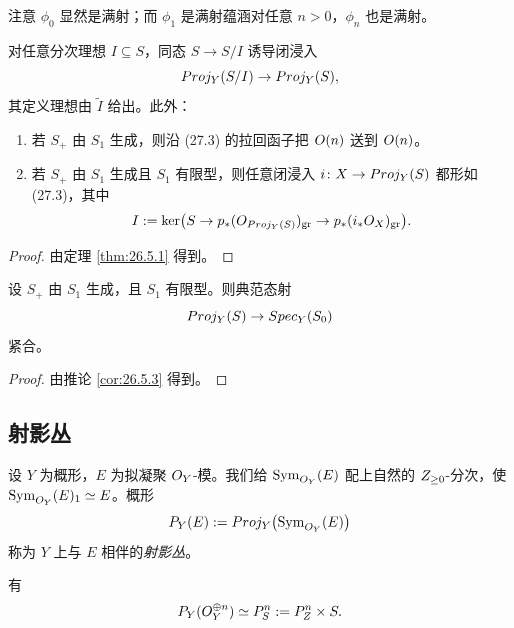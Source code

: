 \begin{remark}\label{rem:27.3.8}
注意 $\phi_0$ 显然是满射；而 $\phi_1$ 是满射蕴涵对任意 $n > 0$，$\phi_n$ 也是满射。
\end{remark}

\begin{corollary}\label{cor:27.3.9}
对任意分次理想 $I \subseteq S$，同态 $S \to S/I$ 诱导闭浸入
\begin{equation}\label{eq:27.3}
Proj_Y(S/I) \to Proj_Y(S),
\end{equation}
其定义理想由 $\widetilde{I}$ 给出。此外：
\begin{enumerate}[label=(\arabic*),leftmargin=2.4em,itemsep=0.25ex]
  \item 若 $S_+$ 由 $S_1$ 生成，则沿 (27.3) 的拉回函子把 $O(n)$ 送到 $O(n)$。
  \item 若 $S_+$ 由 $S_1$ 生成且 $S_1$ 有限型，则任意闭浸入 $i \colon X \to Proj_Y(S)$ 都形如 (27.3)，其中
  \[
  I := \ker\bigl(S \to p_*(O_{Proj_Y(S)})_{\mathrm{gr}} \to p_*(i_*O_X)_{\mathrm{gr}}\bigr).
  \]
\end{enumerate}
\end{corollary}

\begin{proof}
由定理 \ref{thm:26.5.1} 得到。
\end{proof}

\begin{corollary}\label{cor:27.3.10}
设 $S_+$ 由 $S_1$ 生成，且 $S_1$ 有限型。则典范态射
\[
Proj_Y(S) \to Spec_Y(S_0)
\]
紧合。
\end{corollary}

\begin{proof}
由推论 \ref{cor:26.5.3} 得到。
\end{proof}

\subsection{射影丛}\label{sec:27.4}

\begin{construction}\label{con:27.4.1}
设 $Y$ 为概形，$E$ 为拟凝聚 $O_Y$-模。我们给 $\operatorname{Sym}_{O_Y}(E)$ 配上自然的 $Z_{\ge 0}$-分次，使 $\operatorname{Sym}_{O_Y}(E)_1 \simeq E$。概形
\[
P_Y(E) := Proj_Y\bigl(\operatorname{Sym}_{O_Y}(E)\bigr)
\]
称为 $Y$ 上与 $E$ 相伴的\emph{射影丛}。
\end{construction}

\begin{example}\label{ex:27.4.2}
有
\[
P_Y(O_Y^{\oplus n}) \simeq P^n_S := P^n_Z \times S.
\]
\end{example}

